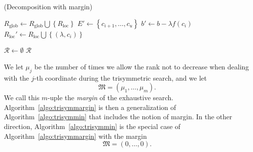 \begin{algorithm}
  \caption{(Decomposition with margin)}\label{algo:decompmargin}
  \begin{algorithmic}[1]

    \State $R_\text{glob}\gets R_\text{glob}\bigcup\left\{R_\text{loc}\right\}$
    \State {}
   \Else
   \State $E'\gets\left\{ c_{i+1}, \dots, c_u \right\}$
    \State $b'\gets b-\lambda f(c_i)$
    \State $R_\text{loc}'\gets R_\text{loc}\bigcup\left\{ (\lambda, c_i)
    \right\}$
    \State {}
    \Else
    \State {}
    \EndIf
    \EndFor
    \EndFor
    \EndIf
    \EndIf
    \EndProcedure

    \State $\mathcal R\gets\emptyset$
    \State {}
    \State \Return $\mathcal R$
  \end{algorithmic}
\end{algorithm}
We let $\mu_j$ be the number of times we allow the rank not to decrease when
dealing with the $j$-th coordinate during the trisymmetric search, and we let
\[
  \mathfrak M=(\mu_1, \dots, \mu_m).
\]
We call this $m$-uple the \emph{margin} of the exhaustive search.
Algorithm~\ref{algo:trisymmargin} is then a generalization of
Algorithm~\ref{algo:trisymmin} that includes the notion of margin. In the other
direction, Algorithm~\ref{algo:trisymmin} is the special case of
Algorithm~\ref{algo:trisymmargin} with the margin
\[
  \mathfrak M = (0, \dots, 0).
\]
